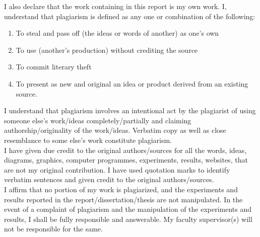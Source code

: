 \documentclass[12pt,a4paper]{article}
\begin{document}
\noindent I also declare that the work containing in this report is my own work. I, understand that plagiarism is defined as any one or combination of the following:
\begin{enumerate}
\item To steal and pass off (the ideas or words of another) as one's own
\item To use (another's production) without crediting the source
\item To commit literary theft
\item To present as new and original an idea or product derived from an existing source.
\end{enumerate}
I understand that plagiarism involves an intentional act by the plagiarist of using someone else's work/ideas completely/partially and claiming authorship/originality of the work/ideas. Verbatim copy as well as close resemblance to some else's work constitute plagiarism.\\

\noindent I have given due credit to the original authors/sources for all the words, ideas, diagrams, graphics, computer programmes, experiments, results, websites, that are not my original contribution. I have used quotation marks to identify verbatim sentences and given credit to the original authors/sources.\\

\noindent I affirm that no portion of my work is plagiarized, and the experiments and results reported in the report/dissertation/thesis are not manipulated. In the event of a complaint of plagiarism and the manipulation of the experiments and results, I shall be fully responsible and answerable. My faculty supervisor(s) will not be responsible for the same.\vspace{1cm}\\
\end{document}

